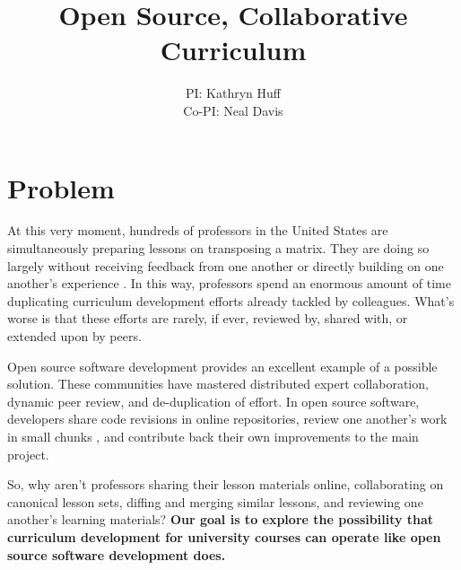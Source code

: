 \documentclass[11pt]{article}
\makeatletter
\newcommand{\authorname}{Kathryn~D.~Huff }
\newcommand{\authoremail}{katyhuff@illinois.edu}
\newcommand{\authorsite}{arfc.npre.illinois.edu}
\makeatother
\begin{document}
          \title{Open Source, Collaborative Curriculum}
          \author{PI: Kathryn Huff\\Co-PI: Neal Davis}
          \maketitle

          \pagestyle{fancy}
          \lhead{\textcolor{gray}{PI: \authorname (NPRE)\\\authoremail}}
          \rhead{\textcolor{gray}{Collaborative Open Source Curriculum Development\\}}
          \renewcommand{\headrulewidth}{0pt}
          \renewcommand{\footrulewidth}{0pt}
          \fancyfoot[C]{\footnotesize \textcolor{gray}{\authorsite}}

          \section*{Problem}
          At this very moment, hundreds of professors in the United States are 
          simultaneously preparing lessons on transposing a matrix.
          They are doing so largely without receiving feedback from one another 
          or directly building on one another's experience 
          \cite{green_building_2014}. In this way, 
          professors spend an enormous amount of time duplicating curriculum 
          development efforts already tackled by colleagues. What's worse is 
          that these efforts are rarely, if ever, reviewed by, shared with, or 
          extended upon by peers.
          
          Open source software development provides an excellent 
          example of a possible solution.
          These communities have mastered distributed expert collaboration, 
          dynamic peer review, and de-duplication of effort. In open source 
          software, developers share code revisions in online repositories, 
          review one another's work in small chunks \cite{wilson_best_2014}, 
          and contribute back their own improvements to the main project.

          So, why aren't professors sharing their lesson materials online, 
          collaborating on canonical lesson sets, diffing and merging similar 
          lessons, and reviewing one another's learning materials? \textbf{Our 
          goal is to explore the possibility that curriculum development for 
          university courses can operate like open source software development 
          does.}
           
\end{document}
